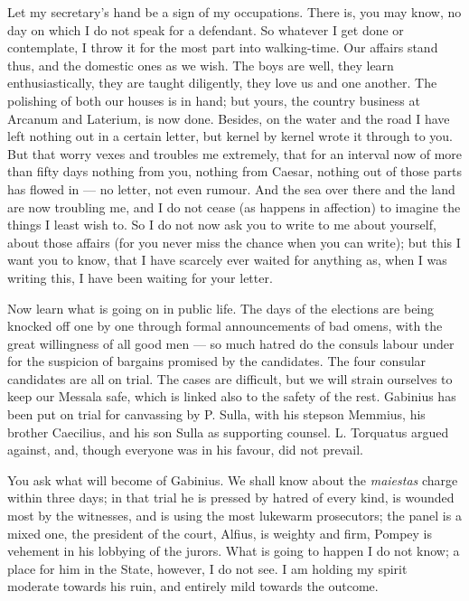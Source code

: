

 Let my secretary's hand be a sign of my occupations. There is, you may know, no day on which I do not speak for a defendant. So whatever I get done or contemplate, I throw it for the most part into walking-time. Our affairs stand thus, and the domestic ones as we wish. The boys are well, they learn enthusiastically, they are taught diligently, they love us and one another. The polishing of both our houses is in hand; but yours, the country business at Arcanum and Laterium, is now done. Besides, on the water and the road I have left nothing out in a certain letter, but kernel by kernel wrote it through to you. But that worry vexes and troubles me extremely, that for an interval now of more than fifty days nothing from you, nothing from Caesar, nothing out of those parts has flowed in --- no letter, not even rumour. And the sea over there and the land are now troubling me, and I do not cease (as happens in affection) to imagine the things I least wish to. So I do not now ask you to write to me about yourself, about those affairs (for you never miss the chance when you can write); but this I want you to know, that I have scarcely ever waited for anything as, when I was writing this, I have been waiting for your letter.

 Now learn what is going on in public life. The days of the elections are being knocked off one by one through formal announcements of bad omens, with the great willingness of all good men --- so much hatred do the consuls labour under for the suspicion of bargains promised by the candidates. The four consular candidates are all on trial. The cases are difficult, but we will strain ourselves to keep our Messala safe, which is linked also to the safety of the rest. Gabinius has been put on trial for canvassing by P. Sulla, with his stepson Memmius, his brother Caecilius, and his son Sulla as supporting counsel. L. Torquatus argued against, and, though everyone was in his favour, did not prevail.

 You ask what will become of Gabinius. We shall know about the \textit{maiestas} charge within three days; in that trial he is pressed by hatred of every kind, is wounded most by the witnesses, and is using the most lukewarm prosecutors; the panel is a mixed one, the president of the court, Alfius, is weighty and firm, Pompey is vehement in his lobbying of the jurors. What is going to happen I do not know; a place for him in the State, however, I do not see. I am holding my spirit moderate towards his ruin, and entirely mild towards the outcome.

